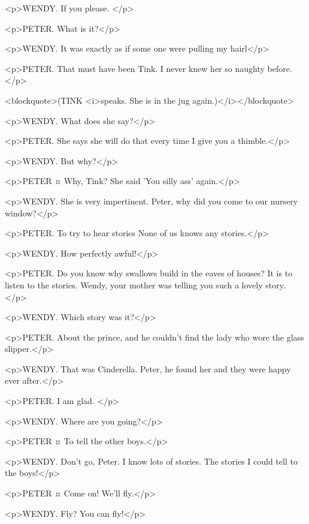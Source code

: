 <p>WENDY. If you please.
</p>

<p>PETER. What is it?</p>

<p>WENDY. It was exactly as if some one were pulling my hairl</p>

<p>PETER. That must have been Tink. I never knew her so naughty before.</p>

<blockquote>(TINK <i>speaks. She is in the jug again.)</i></blockquote>

<p>WENDY. What does she say?</p>

<p>PETER. She says she will do that every time I give you a thimble.</p>

<p>WENDY. But why?</p>

<p>PETER ¤
Why, Tink?
She said 'You silly ass' again.</p>

<p>WENDY. She is very impertinent.
Peter, why did you come to our nursery window?</p>

<p>PETER. To try to hear stories None of us knows any stories.</p>

<p>WENDY. How perfectly awful!</p>

<p>PETER. Do you know why swallows build in the eaves of houses? It is to listen to the stories. Wendy, your mother was telling you such a lovely story.</p>

<p>WENDY. Which story was it?</p>

<p>PETER. About the prince, and he couldn't find the lady who wore the glass slipper.</p>

<p>WENDY. That was Cinderella. Peter, he found her and they were happy ever after.</p>

<p>PETER. I am glad.
</p>

<p>WENDY. Where are you going?</p>

<p>PETER ¤
To tell the other boys.</p>

<p>WENDY. Don't go, Peter. I know lots of stories. The stories I could tell to the boys!</p>

<p>PETER ¤
Come on! We'll fly.</p>

<p>WENDY. Fly? You can fly!</p>


